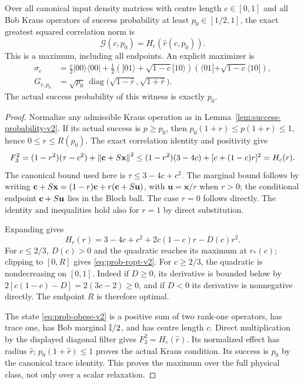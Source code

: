 \begin{theorem}
\label{thm:probability-envelope-v2}
Over all canonical input density matrices with centre length $c\in[0,1]$
and all Bob Kraus operators of success probability at least
$p_0\in[1/2,1]$, the exact greatest squared correlation norm is
\begin{equation}\label{eq:prob-envelope-v2}
 \boxed{\quad \mathcal G(c,p_0)=H_c(\widehat r(c,p_0)).\quad}
\end{equation}
This is a maximum, including all endpoints. An explicit maximizer is
\begin{align}
 \sigma_c&=\frac c2|00\rangle\langle00|
 +\frac12(|01\rangle+\sqrt{1-c}|10\rangle)
           (\langle01|+\sqrt{1-c}\langle10|),\label{eq:prob-obese-v2}\\
 G_{c,p_0}&=\sqrt{p_0}\,
     \operatorname{diag}\bigl(\sqrt{1-\widehat r},
                              \sqrt{1+\widehat r}\bigr).
\end{align}
The actual success probability of this witness is exactly $p_0$.
\end{theorem}

\begin{proof}
Normalize any admissible Kraus operation as in
Lemma~\ref{lem:success-probability-v2}. If its actual success is $p\geq p_0$,
then $p_0(1+r)\leq p(1+r)\leq1$, hence $0\leq r\leq R(p_0)$.
The exact correlation identity and positivity give
\[
 F_3^2=(1-r^2)(\tau-c^2)+\left\lVert\mathbf c+S\mathbf x\right\rVert^2
 \leq(1-r^2)(3-4c)+[c+(1-c)r]^2=H_c(r).
\]
The canonical bound used here is $\tau\leq3-4c+c^2$. The marginal bound
follows by writing
$\mathbf c+S\mathbf x=(1-r)\mathbf c+r(\mathbf c+S\mathbf u)$, with
$\mathbf u=\mathbf x/r$ when $r>0$; the conditional endpoint
$\mathbf c+S\mathbf u$ lies in the Bloch ball. The case $r=0$ follows directly.
The identity and inequalities hold also for $r=1$ by direct substitution.

Expanding gives
\[
 H_c(r)=3-4c+c^2+2c(1-c)r-D(c)r^2.
\]
For $c\leq2/3$, $D(c)>0$ and the quadratic reaches its maximum at $r_*(c)$;
clipping to $[0,R]$ gives \eqref{eq:prob-ropt-v2}. For $c\geq2/3$, the
quadratic is nondecreasing on $[0,1]$. Indeed if $D\geq0$, its derivative
is bounded below by $2[c(1-c)-D]=2(3c-2)\geq0$, and if $D<0$ its derivative
is nonnegative directly. The endpoint $R$ is therefore optimal.

The state \eqref{eq:prob-obese-v2} is a positive sum of two rank-one
operators, has trace one, has Bob marginal $\mathbb I/2$, and has centre length
$c$. Direct multiplication by the displayed diagonal filter gives
$F_3^2=H_c(\widehat r)$. Its normalized effect has radius $\widehat r$;
$p_0(1+\widehat r)\leq1$ proves the actual Kraus condition. Its success is
$p_0$ by the canonical trace identity. This proves the maximum over the
full physical class, not only over a scalar relaxation.
\end{proof}

